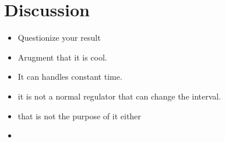 \section{Discussion}
\begin{itemize}
\item Questionize your result
\item Arugment that it is cool.
\item It can handles constant time.
\item it is not a normal regulator that can change the interval.
\item that is not the purpose of it either
\item 
\end{itemize}